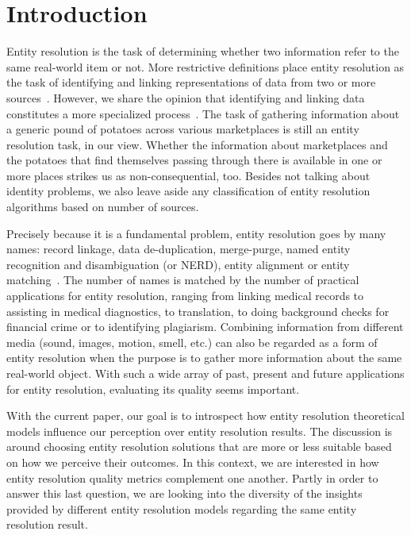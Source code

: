 \documentclass[journal]{IEEEtran}
\begin{document}
    \section{Introduction}\label{sec:Introduction}
    Entity resolution is the task of determining whether two information refer
    to the same real-world item or not.
    More restrictive definitions place entity resolution as the task of
    identifying and linking representations of data from two or more
    sources~\cite{Qia17}.
    However, we share the opinion that identifying and linking data constitutes
    a more specialized process~\cite{Tal11}.
    The task of gathering information about a generic pound of potatoes across
    various marketplaces is still an entity resolution task, in our view.
    Whether the information about marketplaces and the potatoes that find
    themselves passing through there is available in one or more places strikes
    us as non-consequential, too.
    Besides not talking about identity problems, we also leave aside any
    classification of entity resolution algorithms based on number of sources.
    
    Precisely because it is a fundamental problem, entity resolution goes by
    many names: record linkage, data de-duplication, merge-purge, named entity
    recognition and disambiguation (or NERD), entity alignment or entity
    matching~\cite{Tal11,fever2009,alhelbawy2014}.
    The number of names is matched by the number of practical applications for
    entity resolution, ranging from linking medical records to assisting in
    medical diagnostics, to translation, to doing background checks for
    financial crime or to identifying plagiarism.
    Combining information from different media (sound, images, motion, smell,
    etc.) can also be regarded as a form of entity resolution when the purpose
    is to gather more information about the same real-world object.
    With such a wide array of past, present and future applications for entity
    resolution, evaluating its quality seems important.

    With the current paper, our goal is to introspect how entity resolution
    theoretical models influence our perception over entity resolution results.
    The discussion is around choosing entity resolution solutions that are
    more or less suitable based on how we perceive their outcomes.
    In this context, we are interested in how entity resolution quality metrics
    complement one another.
    Partly in order to answer this last question, we are looking into the
    diversity of the insights provided by different entity resolution models
    regarding the same entity resolution result.
    
\end{document}
